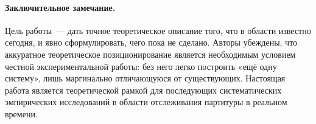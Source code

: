\paragraph*{Заключительное замечание.} Цель работы~--- дать
точное теоретическое описание того, что в области известно
сегодня, и явно сформулировать, чего пока не сделано. Авторы
убеждены, что аккуратное теоретическое позиционирование
является необходимым условием честной экспериментальной работы:
без него легко построить «ещё одну систему», лишь маргинально
отличающуюся от существующих. Настоящая работа является
теоретической рамкой для последующих систематических
эмпирических исследований в области отслеживания партитуры в
реальном времени.
